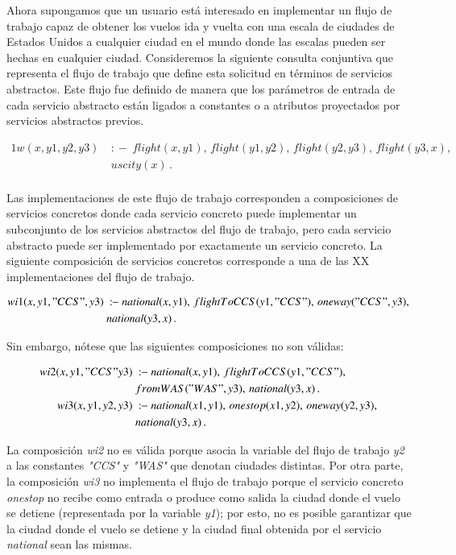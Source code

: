 \documentclass{llncs}
\newcommand{\qrule}{:\!\!-}
\begin{document}
Ahora supongamos que un usuario está interesado en implementar un flujo de
trabajo capaz de obtener los vuelos ida y vuelta con una escala de ciudades de
Estados Unidos a cualquier ciudad en el mundo donde las escalas pueden ser
hechas en cualquier ciudad. Consideremos la siguiente consulta conjuntiva que
representa el flujo de trabajo que define esta solicitud en términos de
servicios abstractos. Este flujo fue definido de manera que los parámetros de
entrada de cada servicio abstracto están ligados a constantes o a
atributos proyectados por servicios abstractos previos.

\begin{alignat*}{1}
w(x,y1,y2,y3)\ &\qrule\ flight(x,y1),\, flight(y1,y2),\,  flight(y2,y3),\,  flight(y3,x),\,  \\
                   \ & uscity(x)\,. \\
\end{alignat*}

Las implementaciones de este flujo de trabajo corresponden a composiciones de
servicios concretos donde cada servicio concreto puede implementar un
subconjunto de los servicios abstractos del flujo de trabajo, pero cada servicio
abstracto puede ser implementado por exactamente un servicio concreto. La
siguiente composición de servicios concretos corresponde a una de las XX
implementaciones del flujo de trabajo.

\begin{alignat*}{1}
wi1(x,y1,"CCS",y3)\ &\qrule\ national(x,y1),\, flightToCCS(y1,"CCS"),\,  oneway("CCS",y3),\,  \\
\ & national(y3,x)\,.  \\
\end{alignat*}

Sin embargo, nótese que las siguientes composiciones no son válidas:

\begin{alignat*}{1}
wi2(x,y1,"CCS"y3)\ &\qrule\ national(x,y1),\, flightToCCS(y1,"CCS"),\, \\
\ & fromWAS("WAS",y3),\,  national(y3,x)\,. \\
wi3(x,y1,y2,y3)\ &\qrule\ national(x1,y1),\, onestop(x1,y2),\,  oneway(y2,y3),\,  \\
\ & national(y3,x)\,. \\
\end{alignat*}

La composición {\it wi2} no es válida porque asocia la variable del flujo de
trabajo {\it y2} a las constantes {\it "CCS"} y {\it "WAS"} que denotan ciudades
distintas. Por otra parte, la composición {\it wi3} no implementa el flujo de
trabajo porque el servicio concreto {\it onestop} no recibe como entrada o
produce como salida la ciudad donde el vuelo se detiene (representada por la
variable {\it y1}); por esto, no es posible garantizar que la ciudad donde el
vuelo se detiene y la ciudad final obtenida por el servicio {\it national} sean
las mismas.
\end{document}
